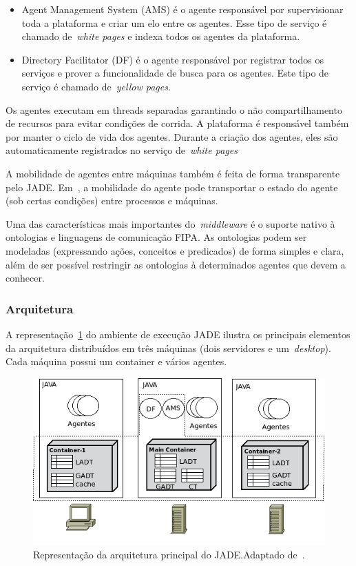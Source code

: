 \begin{itemize}
	\item Agent Management System (AMS) é o agente responsável por supervisionar toda a plataforma e criar um elo entre os agentes. Esse tipo de serviço é chamado de~\emph{white pages} e indexa todos os agentes da plataforma.
	\item Directory Facilitator (DF) é o agente responsável por registrar todos os serviços e prover a funcionalidade de busca para os agentes. Este tipo de serviço é chamado de~\emph{yellow pages}.
\end{itemize}

Os agentes executam em threads separadas garantindo o não compartilhamento de recursos para evitar condições de corrida. A plataforma é responsável também por manter o ciclo de vida dos agentes. Durante a criação dos agentes, eles são automaticamente registrados no serviço de~\emph{white pages}

A mobilidade de agentes entre máquinas também é feita de forma transparente pelo JADE. Em~\cite{bellifemine07}, a mobilidade do agente pode transportar o estado do agente (sob certas condições) entre processos e máquinas.

Uma das características mais importantes do~\emph{middleware} é o suporte nativo à ontologias e linguagens de comunicação FIPA. As ontologias podem ser modeladas (expressando ações, conceitos e predicados) de forma simples e clara, além de ser possível restringir as ontologias à determinados agentes que devem a conhecer.

\subsubsection{Arquitetura}

A representação~\ref{fig:arquitetura-jade} do ambiente de execução JADE ilustra os principais elementos da arquitetura distribuídos em três máquinas (dois servidores e um~\emph{desktop}). Cada máquina possui um container e vários agentes.

\begin{figure}
	\centering
	\includegraphics[scale=0.65]{images/arquitetura-jade.png}
	\caption{Representação da arquitetura principal do JADE.Adaptado de~\cite{bellifemine07}.}
	\label{fig:arquitetura-jade}
\end{figure}

